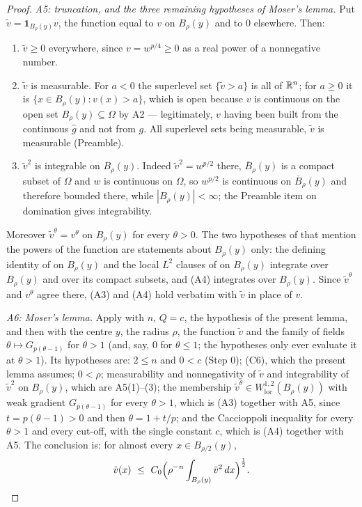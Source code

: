 \begin{proof}
\emph{A5: truncation, and the three remaining hypotheses of Moser's lemma.}  Put
$\tilde v=\mathbf1_{B_\rho(y)}v$, the function equal to $v$ on $B_\rho(y)$ and
to $0$ elsewhere.  Then:
\begin{enumerate}
\item $\tilde v\ge0$ everywhere, since $v=w^{p/4}\ge0$ as a real power of a
  nonnegative number.
\item $\tilde v$ is measurable.  For $a<0$ the superlevel set $\{\tilde v>a\}$
  is all of $\mathbb{R}^n$; for $a\ge0$ it is $\{x\in B_\rho(y):v(x)>a\}$, which is open
  because $v$ is continuous on the open set $B_\rho(y)\subseteq\Omega$ by A2 ---
  legitimately, $v$ having been built from the continuous $\hat g$ and not from
  $g$.  All superlevel sets being measurable, $\tilde v$ is measurable
  (Preamble).
\item $\tilde v^2$ is integrable on $B_\rho(y)$.  Indeed $\tilde v^2=w^{p/2}$
  there, $\overline B_\rho(y)$ is a compact subset of $\Omega$ and $w$ is
  continuous on $\Omega$, so $w^{p/2}$ is continuous on $\overline B_\rho(y)$
  and therefore bounded there, while $|B_\rho(y)|<\infty$; the Preamble item on
  domination gives integrability.
\end{enumerate}
Moreover $\tilde v^\theta=v^\theta$ on $B_\rho(y)$ for every $\theta>0$.  The
two hypotheses of  that mention the powers of the
function are statements about $B_\rho(y)$ only: the defining identity of
 on $B_\rho(y)$ and the local $L^2$ clauses of
 on $B_\rho(y)$ integrate over $B_\rho(y)$ and over its
compact subsets, and (A4) integrates over $B_\rho(y)$.  Since $\tilde v^\theta$
and $v^\theta$ agree there, (A3) and (A4) hold verbatim with $\tilde v$ in place
of $v$.

\emph{A6: Moser's lemma.}  Apply  with $n$,
$Q=c$, the hypothesis  of the present lemma,
and then with the centre $y$, the radius $\rho$, the function $\tilde v$ and the
family of fields $\theta\mapsto G_{p(\theta-1)}$ for $\theta>1$ (and, say, $0$
for $\theta\le1$; the hypotheses only ever evaluate it at $\theta>1$).  Its
hypotheses are: $2\le n$ and $0<c$ (Step 0); (C6), which the present lemma
assumes; $0<\rho$; measurability and nonnegativity of $\tilde v$ and
integrability of $\tilde v^2$ on $B_\rho(y)$, which are A5(1)--(3); the
membership $\tilde v^\theta\in W^{1,2}_{\mathrm{loc}}(B_\rho(y))$ with weak
gradient $G_{p(\theta-1)}$ for every $\theta>1$, which is (A3) together with A5,
since $t=p(\theta-1)>0$ and then $\theta=1+t/p$; and the Caccioppoli inequality
for every $\theta>1$ and every cut-off, with the single constant $c$, which is
(A4) together with A5.  The conclusion is: for almost every
$x\in B_{\rho/2}(y)$,
\[
\tilde v(x)\ \le\ C_0\Bigl(\rho^{-n}\int_{B_\rho(y)}\tilde v^2\,dx\Bigr)^{\frac12}.
\]


\end{proof}
